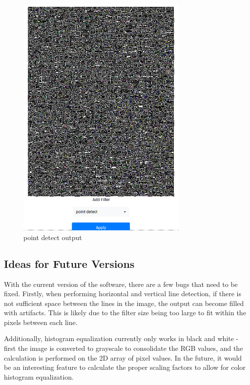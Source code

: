 \documentclass{article}
\let\Oldsubsection\subsection
\renewcommand{\subsection}{\FloatBarrier\Oldsubsection}
\begin{document}
  \begin{figure}[!htb]
    \centering
    \includegraphics[width=0.75\textwidth]{assets/point_detect.png}
    \caption{point detect output}
    \label{fig:point-detect-output}
  \end{figure}

  \subsection{Ideas for Future Versions}

  With the current version of the software, there are a few bugs that need to be fixed. Firstly, when performing horizontal and vertical line detection, if there is not sufficient space between the lines in the image, the output can become filled with artifacts. This is likely due to the filter size being too large to fit within the pixels between each line.

  Additionally, histogram equalization currently only works in black and white - first the image is converted to grayscale to consolidate the RGB values, and the calculation is performed on the 2D array of pixel values. In the future, it would be an interesting feature to calculate the proper scaling factors to allow for color histogram equalization.
  
  \newpage

  \printbibliography

  
\end{document}
